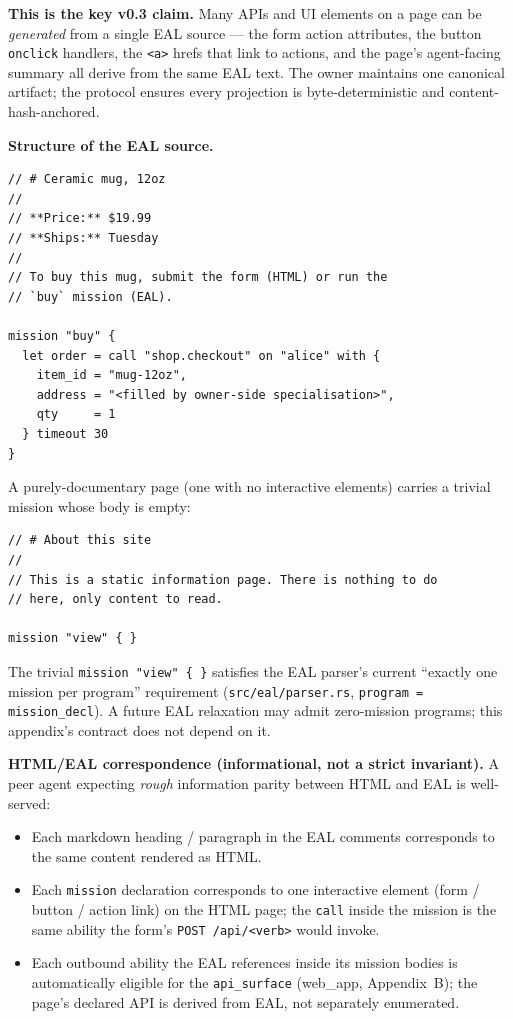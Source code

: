 \documentclass[11pt,a4paper]{article}
\theoremstyle{definition}
\begin{document}
\textbf{This is the key v0.3 claim.} Many APIs and UI elements
on a page can be \emph{generated} from a single EAL source ---
the form action attributes, the button \texttt{onclick}
handlers, the \texttt{<a>} hrefs that link to actions, and
the page's agent-facing summary all derive from the same EAL
text. The owner maintains one canonical artifact; the protocol
ensures every projection is byte-deterministic and
content-hash-anchored.

\textbf{Structure of the EAL source.}

\begin{lstlisting}
// # Ceramic mug, 12oz
//
// **Price:** $19.99
// **Ships:** Tuesday
//
// To buy this mug, submit the form (HTML) or run the
// `buy` mission (EAL).

mission "buy" {
  let order = call "shop.checkout" on "alice" with {
    item_id = "mug-12oz",
    address = "<filled by owner-side specialisation>",
    qty     = 1
  } timeout 30
}
\end{lstlisting}

A purely-documentary page (one with no interactive elements)
carries a trivial mission whose body is empty:

\begin{lstlisting}
// # About this site
//
// This is a static information page. There is nothing to do
// here, only content to read.

mission "view" { }
\end{lstlisting}

The trivial \texttt{mission "view" \{ \}} satisfies the EAL
parser's current ``exactly one mission per program''
requirement (\texttt{src/eal/parser.rs}, \texttt{program =
mission\_decl}). A future EAL relaxation may admit zero-mission
programs; this appendix's contract does not depend on it.

\textbf{HTML/EAL correspondence (informational, not a strict
invariant).} A peer agent expecting \emph{rough} information
parity between HTML and EAL is well-served:

\begin{itemize}[leftmargin=2em,itemsep=0.15em]
    \item Each markdown heading / paragraph in the EAL comments
    corresponds to the same content rendered as HTML.
    \item Each \texttt{mission} declaration corresponds to one
    interactive element (form / button / action link) on the
    HTML page; the \texttt{call} inside the mission is the same
    ability the form's \texttt{POST /api/<verb>} would invoke.
    \item Each outbound ability the EAL references inside its
    mission bodies is automatically eligible for the
    \texttt{api\_surface} (web\_app, Appendix~B); the page's
    declared API is derived from EAL, not separately
    enumerated.
\end{itemize}
\end{document}
